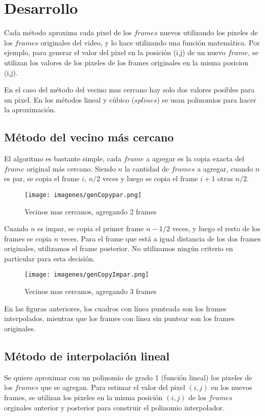 \section{Desarrollo}

Cada método aproxima cada pixel de los $frames$ nuevos utilizando los pixeles de los $frames$ originales del video, y lo hace utilizando una función matemática. 
Por ejemplo, para generar el valor del pixel en la posición (i,j) de un nuevo $frame$, se utilizan los valores de los pixeles de los frames originales en la misma posicion (i,j). 

En el caso del método del vecino mas cercano hay solo dos valores posibles para un pixel. En los métodos lineal y cúbico ($splines$) se usan polinomios para hacer la aproximación.

\subsection{Método del vecino más cercano}
El algoritmo es bastante simple, cada $frame$ a agregar es la copia exacta del $frame$ original más cercano. Siendo $n$ la cantidad de $frames$ a agregar, cuando $n$ es par, se copia el frame $i$, $n/2$ veces y luego se copia el frame $i+1$ otras $n/2$. 

\begin{figure}[h!]
  \centering
    \texttt{[image: imagenes/genCopypar.png]}
  \caption{Vecinos mas cercanos, agregando 2 frames}
\end{figure}

Cuando $n$ es impar, se copia el primer frame $n-1/2$ veces, y luego el resto de los frames se copia $n$ veces. Para el frame que está a igual distancia de los dos frames originales, utilizamos el frame posterior. No utilizamos ningún criterio en particular para esta decisión.

\begin{figure}[h!]
  \centering
    \texttt{[image: imagenes/genCopyImpar.png]}
  \caption{Vecinos mas cercanos, agregando 3 frames}
\end{figure}

En las figuras anteriores, los cuadros con línea punteada son los frames interpolados, mientras que los frames con línea sin puntear son los frames originales.

\subsection{Método de interpolación lineal}
Se quiere aproximar con un polinomio de grado 1 (función lineal) los pixeles de los $frames$ que se agregan. Para estimar el valor del pixel $(i,j)$ en los nuevos frames, se utilizan los pixeles en la
misma posición $(i,j)$ de los $frames$ orginales anterior y posterior para construir el polinomio interpolador. \\

